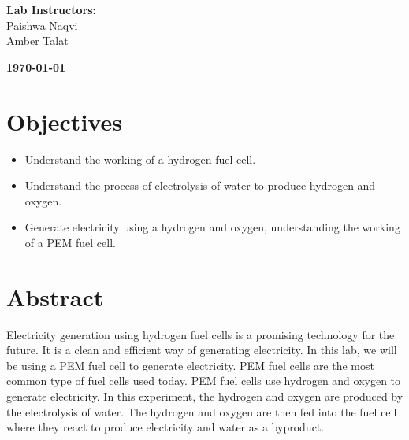 \documentclass[a4paper, 12pt, english]{article}
\begin{document}
\begin{titlepage}
\begin{center}
        \vspace{45pt}
        \textbf {\large Lab Instructors:}\\[0.2cm]
        \Large {Paishwa Naqvi}\\[0.1cm]
        \Large {Amber Talat}\\[0.1cm]
    \end{center}

    \par
    \vfill
    \begin{center}
        \textbf{\today}\\
    \end{center}

\end{titlepage}



\newpage
\section{Objectives}
\begin{itemize}
    \item Understand the working of a hydrogen fuel cell.
    \item Understand the process of electrolysis of water to produce hydrogen and oxygen.
    \item Generate electricity using a hydrogen and oxygen, understanding the working of
          a PEM fuel cell.
\end{itemize}

\section{Abstract}
Electricity generation using hydrogen fuel cells is a promising technology for
the future. It is a clean and efficient way of generating electricity. In this
lab, we will be using a PEM fuel cell to generate electricity. PEM fuel cells
are the most common type of fuel cells used today. PEM fuel cells use hydrogen
and oxygen to generate electricity. In this experiment, the hydrogen and oxygen
are produced by the electrolysis of water. The hydrogen and oxygen are then fed
into the fuel cell where they react to produce electricity and water as a
byproduct.
\end{document}
